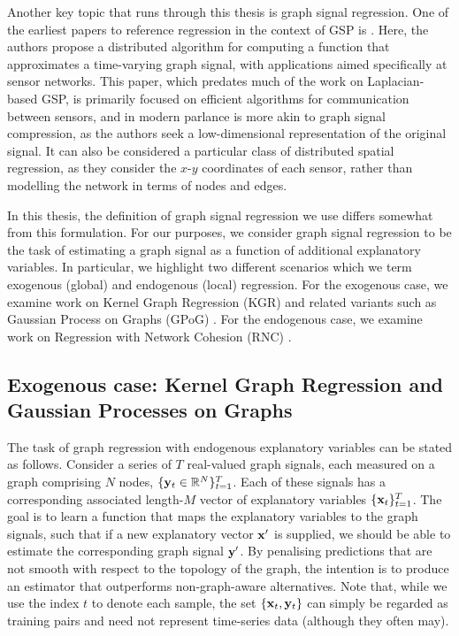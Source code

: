Another key topic that runs through this thesis is graph signal regression. One of the earliest papers to reference regression in the context of GSP is \cite{Guestrin2004}. Here, the authors propose a distributed algorithm for computing a function that approximates a time-varying graph signal, with applications aimed specifically at sensor networks. This paper, which predates much of the work on Laplacian-based GSP, is primarily focused on efficient algorithms for communication between sensors, and in modern parlance is more akin to graph signal compression, as the authors seek a low-dimensional representation of the original signal. It can also be considered a particular class of distributed spatial regression, as they consider the $x$-$y$ coordinates of each sensor, rather than modelling the network in terms of nodes and edges. 

In this thesis, the definition of graph signal regression we use differs somewhat from this formulation. For our purposes, we consider graph signal regression to be the task of estimating a graph signal as a function of additional explanatory variables. In particular, we highlight two different scenarios which we term exogenous (global) and endogenous (local) regression. For the exogenous case, we examine work on Kernel Graph Regression (KGR) \citep{Venkitaraman2019} and related variants such as Gaussian Process on Graphs (GPoG) \cite{Venkitaraman2020}. For the endogenous case, we examine work on Regression with Network Cohesion (RNC) \citep{Li2019}. 


\subsection{Exogenous case: Kernel Graph Regression and Gaussian Processes on Graphs}

The task of graph regression with endogenous explanatory variables can be stated as follows. Consider a series of $T$ real-valued graph signals, each measured on a graph comprising $N$ nodes, $\{\mathbf{y}_t \in \mathbb{R}^N\}_{t=1}^T$. Each of these signals has a corresponding associated length-$M$ vector of explanatory variables $\{\mathbf{x}_t\}_{t=1}^T$. The goal is to learn a function that maps the explanatory variables to the graph signals, such that if a new explanatory vector $\mathbf{x}'$ is supplied, we should be able to estimate the corresponding graph signal $\mathbf{y}'$. By penalising predictions that are not smooth with respect to the topology of the graph, the intention is to produce an estimator that outperforms non-graph-aware alternatives. Note that, while we use the index $t$ to denote each sample, the set $\{\mathbf{x}_t, \mathbf{y}_t\}$ can simply be regarded as training pairs and need not represent time-series data (although they often may). 


